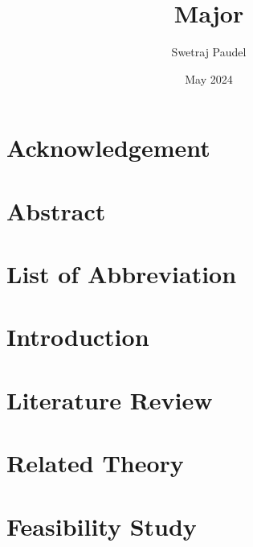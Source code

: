 \documentclass[12pt,a4paper]{report}
\title{Major}
\author{Swetraj Paudel}
\date{May 2024}
\begin{document}
\hypersetup{pageanchor=false}



\chapter*{Acknowledgement}
\label{acknowledgement}


\chapter*{Abstract}
\label{abstract}


\tableofcontents
\thispagestyle{empty}
\newpage

\listoffigures
{}
\newpage

\listoftables
{}
\newpage

\chapter*{List of Abbreviation}
\label{abbreviation}

\newpage

\hypersetup{pageanchor=true}

\chapter{Introduction}
\label{introduction}


\chapter{Literature Review}
\label{literaturereview}


\chapter{Related Theory}
\label{relatedtheory}


\chapter{Feasibility Study}
\label{feasiblity}

\end{document}
